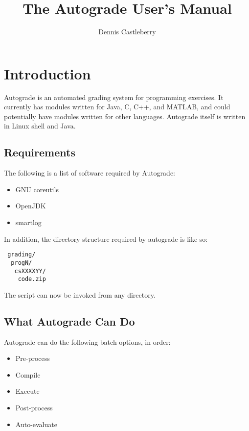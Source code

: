 \documentclass{article}
\title{The Autograde User's Manual}
\author{Dennis Castleberry}
\begin{document}
\maketitle 
\pagebreak

\tableofcontents 
\pagebreak

\section{Introduction}

Autograde is an automated grading system for programming exercises.  It
currently has modules written for Java, C, C++, and MATLAB, and could
potentially have modules written for other languages.  Autograde itself is
written in Linux shell and Java. 

\subsection{Requirements}

The following is a list of software required by Autograde:

\begin{itemize}
\item GNU coreutils
\item OpenJDK
\item smartlog
\end{itemize}

In addition, the directory structure required by autograde is like so:

\begin{verbatim}
 grading/
  progN/
   csXXXXYY/
    code.zip
\end{verbatim}

The script can now be invoked from any directory.

\subsection{What Autograde Can Do}

Autograde can do the following batch options, in order:

\begin{itemize}
\item Pre-process
\item Compile
\item Execute
\item Post-process
\item Auto-evaluate
\end{itemize}
\end{document}

